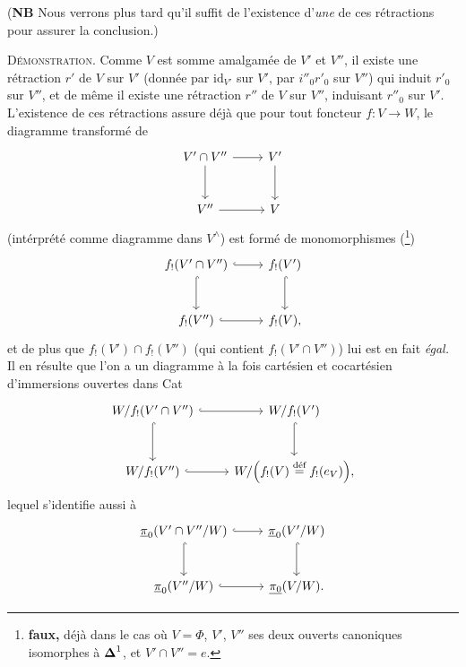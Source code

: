 (\textbf{NB} Nous verrons plus tard qu'il suffit de l'existence d'\textit{une} de ces rétractions pour assurer la conclusion.)

\textsc{Démonstration}. Comme $V$ est somme amalgamée de $V'$ et $V''$, il existe une rétraction $r'$ de $V$ sur $V'$ (donnée par $\mathrm{id}_{V'}$ sur $V'$, par $i''_0r'_0$ sur $V''$) qui induit $r'_0$ sur $V''$, et de même il existe
une rétraction $r''$ de $V$ sur $V''$, induisant $r''_0$ sur $V'$. L'existence de ces rétractions assure déjà que pour tout foncteur $f : V \longrightarrow W$, le diagramme transformé de
\[
\begin{tikzcd}[row sep=large]
V'\cap V'' \arrow[r] \arrow[d] & V' \arrow[d] \\
V'' \arrow[r] & V
\end{tikzcd}
\]
(intérprété comme diagramme dans $V^\wedge$) est formé de monomorphismes (\footnote{\textbf{faux,} déjà dans le cas où $V = \Phi$, $V'$, $V''$ ses deux ouverts canoniques isomorphes à $\boldsymbol{\Delta}^1$, et $V'{\cap}V'' = e$.}) %
\[
\begin{tikzcd}[row sep=large]
f_!(V'\cap V'') \arrow[r, hook] \arrow[d, hook] & f_!(V') \arrow[d, hook] \\
f_!(V'') \arrow[r, hook] & f_!(V),
\end{tikzcd}
\]
et de plus que $f_!(V') \cap f_!(V'')$ (qui contient $f_!(V'\cap V'')$) lui est en fait \textit{égal.} Il en résulte que l'on a un diagramme à la fois cartésien et cocartésien d'immersions ouvertes dans Cat
\[
\begin{tikzcd}[row sep=large]
W/f_!(V'\cap V'') \arrow[r, hook] \arrow[d, hook] & W/f_!(V') \arrow[d, hook] \\
W/f_!(V'') \arrow[r, hook] & W/\Bigl(f_!(V) \overset{\text{déf}}{=} f_!(e_V)\Bigr),
\end{tikzcd}
\]
lequel s'identifie aussi à
\[
\begin{tikzcd}[row sep=large]
\upi_0(V'\cap V''/W) \arrow[r, hook] \arrow[d, hook] & \upi_0(V'/W) \arrow[d, hook] \\
\upi_0(V''/W) \arrow[r, hook] & \underline{\pi_0}(V/W).
\end{tikzcd}
\]

